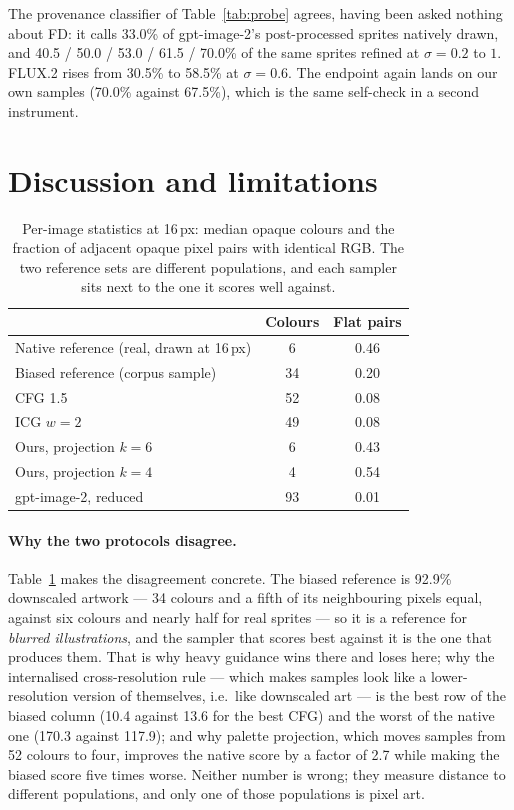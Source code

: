 \documentclass[10pt,twocolumn,letterpaper]{article}
\begin{document}
The provenance classifier of Table~\ref{tab:probe} agrees, having been asked nothing about FD: it calls 33.0\% of
gpt-image-2's post-processed sprites natively drawn, and 40.5 / 50.0 / 53.0 / 61.5 / 70.0\% of the same sprites
refined at $\sigma = 0.2$ to $1$. FLUX.2 rises from 30.5\% to 58.5\% at $\sigma{=}0.6$. The endpoint again lands on our
own samples (70.0\% against 67.5\%), which is the same self-check in a second instrument.

\section{Discussion and limitations}
\label{sec:disc}

\begin{table}[t]
\caption{Per-image statistics at 16\,px: median opaque colours and the fraction of adjacent opaque pixel pairs with
identical RGB. The two reference sets are different populations, and each sampler sits next to the one it scores well
against.}
\label{tab:stats}
\centering
\small
\begin{tabular}{@{}lcc@{}}
\toprule
& Colours & Flat pairs \\
\midrule
Native reference (real, drawn at 16\,px) & 6 & 0.46 \\
Biased reference (corpus sample)         & 34 & 0.20 \\
\midrule
CFG 1.5                                  & 52 & 0.08 \\
ICG $w{=}2$                              & 49 & 0.08 \\
Ours, projection $k{=}6$                 & 6 & 0.43 \\
Ours, projection $k{=}4$                 & 4 & 0.54 \\
gpt-image-2, reduced                     & 93 & 0.01 \\
\bottomrule
\end{tabular}
\end{table}

\paragraph{Why the two protocols disagree.}
Table~\ref{tab:stats} makes the disagreement concrete. The biased reference is 92.9\% downscaled artwork ---
34 colours and a fifth of its neighbouring pixels equal, against six colours and nearly half for real sprites --- so it is a
reference for \emph{blurred illustrations}, and the
sampler that scores best against it is the one that produces them. That is why heavy guidance wins there and loses
here; why the internalised cross-resolution rule --- which makes samples look like a lower-resolution version of
themselves, i.e.~like downscaled art --- is the best row of the biased column (10.4 against 13.6 for the best CFG)
and the worst of the native one (170.3 against 117.9); and why palette projection, which moves samples from 52
colours to four, improves the native score by a factor of 2.7 while making the biased score five times worse.
Neither number is wrong; they measure distance to different populations, and only one of those populations is pixel
art.
\end{document}
